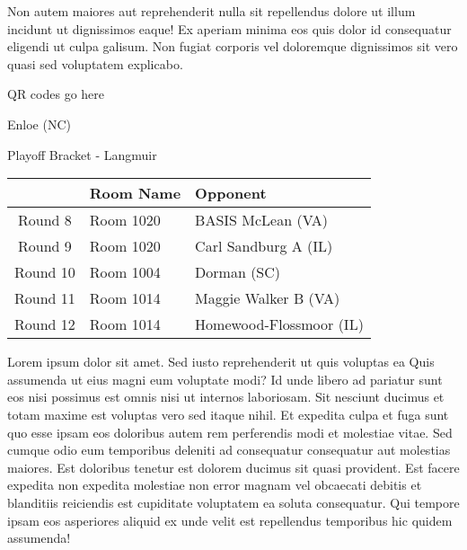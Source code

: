 \documentclass{article}%
\begin{document}
\newline%
Non autem maiores aut reprehenderit nulla sit repellendus dolore ut illum incidunt ut dignissimos eaque! Ex aperiam minima eos quis dolor id consequatur eligendi ut culpa galisum. Non fugiat corporis vel doloremque dignissimos sit vero quasi sed voluptatem explicabo.\newline%
\newline%
%
\vspace*{30pt}%
\begin{center}%
\begin{Huge}%
QR codes go here%
\end{Huge}%
\end{center}%
\newpage%
\begin{center}%
\begin{Huge}%
Enloe (NC)%
\end{Huge}%
\vspace*{8pt}%
\linebreak%
\begin{Large}%
Playoff Bracket {-} Langmuir%
\end{Large}%
\end{center}%
\begin{tabularx}{\textwidth}{|c|Y|Y|}%
\hline%
&Room Name&Opponent\\%
\hline%
Round 8&Room 1020&BASIS McLean (VA)\\%
Round 9&Room 1020&Carl Sandburg A (IL)\\%
Round 10&Room 1004&Dorman (SC)\\%
Round 11&Room 1014&Maggie Walker B (VA)\\%
Round 12&Room 1014&Homewood{-}Flossmoor (IL)\\%
\hline%
\end{tabularx}%
\vspace*{8pt}%
\linebreak%
\newline%
\newline%
Lorem ipsum dolor sit amet. Sed iusto reprehenderit ut quis voluptas ea Quis assumenda ut eius magni eum voluptate modi? Id unde libero ad pariatur sunt eos nisi possimus est omnis nisi ut internos laboriosam. Sit nesciunt ducimus et totam maxime est voluptas vero sed itaque nihil. Et expedita culpa et fuga sunt quo esse ipsam eos doloribus autem rem perferendis modi et molestiae vitae.\newline%
\newline%
Sed cumque odio eum temporibus deleniti ad consequatur consequatur aut molestias maiores. Est doloribus tenetur est dolorem ducimus sit quasi provident. Est facere expedita non expedita molestiae non error magnam vel obcaecati debitis et blanditiis reiciendis est cupiditate voluptatem ea soluta consequatur. Qui tempore ipsam eos asperiores aliquid ex unde velit est repellendus temporibus hic quidem assumenda!\newline%
\end{document}
